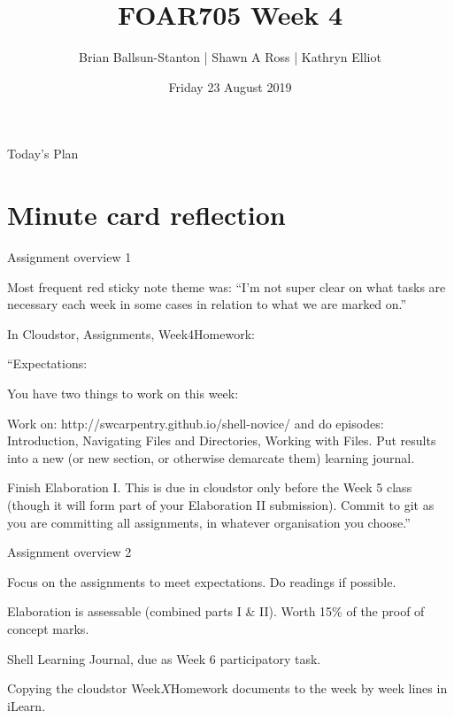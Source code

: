 \documentclass[aspectratio=1610, 11pt]{beamer} %
\title{FOAR705 Week 4} %
\author{Brian Ballsun-Stanton | Shawn A Ross | Kathryn Elliot}               %
\institute{Faculty of Arts}         %
\date{Friday 23 August 2019}                 %
\begin{document}

\maketitle

  

\begin{frame}{Today's Plan}
  \tableofcontents
\end{frame}

\section{Minute card reflection}
\begin{frame}{Assignment overview 1}

Most frequent red sticky note theme was: ``I'm not super clear on what tasks are necessary each week in some cases in relation to what we are marked on.'' 

In Cloudstor, Assignments, Week4Homework:

``Expectations:

You have two things to work on this week:

Work on: http://swcarpentry.github.io/shell-novice/ and do episodes: Introduction, Navigating Files and Directories, Working with Files. Put results into a new (or new section, or otherwise demarcate them) learning journal.

Finish Elaboration I. This is due in cloudstor only before the Week 5 class (though it will form part of your Elaboration II submission). Commit to git as you are committing all assignments, in whatever organisation you choose.''

\end{frame}

\begin{frame}{Assignment overview 2}

Focus on the assignments to meet expectations. Do readings if possible. 

Elaboration is assessable (combined parts I \& II). Worth 15\% of the proof of concept marks. 

Shell Learning Journal, due as Week 6 participatory task.

Copying the cloudstor Week$X$Homework documents to the week by week lines in iLearn. 

\end{frame}
\end{document}
